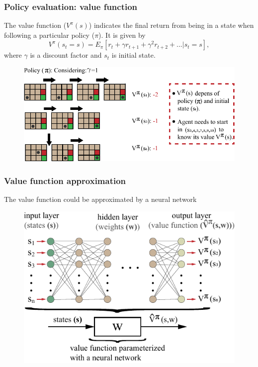 \begin{frame}
	\frametitle{Policy evaluation: value function}
	The value function ($V^{\pi}(s)$) indicates the final return from being in a state when following a particular policy ($\pi$)\footnotemark[1]. It is given by
	\begin{equation*}
		V^{\pi}(s_t= s) = E_{\pi}  \left[r_t + \gamma r_{t+1} + \gamma^{2} r_{t+2}+ . . . | s_t = s \right],
	\end{equation*}
	\noindent where $\gamma$ is a discount factor and $s_t$ is initial state.
	
	\begin{figure}
		\centering
		\includegraphics{policy_selection_v2.pdf}
	\end{figure}

\end{frame}

\begin{frame}
	\frametitle{Value function approximation}
	The value function could be approximated by a neural network

	\begin{figure}
		\includegraphics{value_function_cnn.pdf}
	\end{figure}
	
\end{frame}

